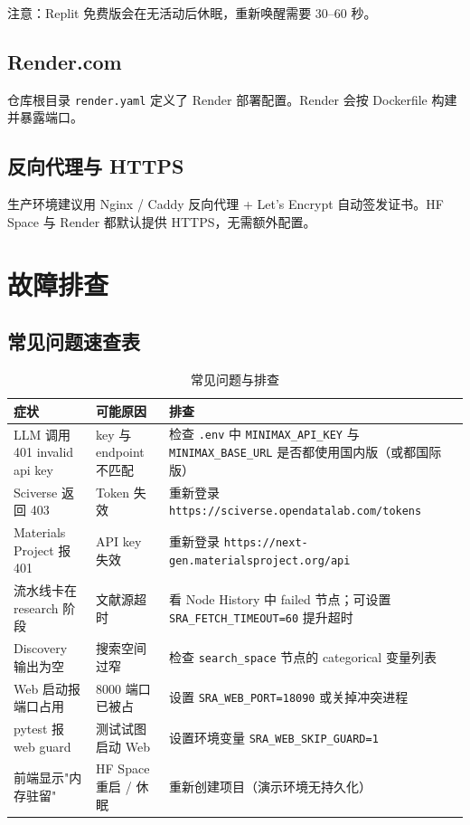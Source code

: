 \documentclass[11pt,a4paper]{article}
\begin{document}
注意：Replit 免费版会在无活动后休眠，重新唤醒需要 30--60 秒。

\subsection{Render.com}

仓库根目录 \texttt{render.yaml} 定义了 Render 部署配置。Render 会按 Dockerfile 构建并暴露端口。

\subsection{反向代理与 HTTPS}

生产环境建议用 Nginx / Caddy 反向代理 + Let's Encrypt 自动签发证书。HF Space 与 Render 都默认提供 HTTPS，无需额外配置。

\section{故障排查}

\subsection{常见问题速查表}

\begin{table}[h]
\centering
\small
\caption{常见问题与排查}
\begin{tabular}{@{}p{4cm}p{6cm}p{3cm}@{}}
\toprule
\textbf{症状} & \textbf{可能原因} & \textbf{排查} \\
\midrule
LLM 调用 401 invalid api key & key 与 endpoint 不匹配 & 检查 \texttt{.env} 中 \texttt{MINIMAX\_API\_KEY} 与 \texttt{MINIMAX\_BASE\_URL} 是否都使用国内版（或都国际版）\\
Sciverse 返回 403 & Token 失效 & 重新登录 \texttt{https://sciverse.opendatalab.com/tokens} \\
Materials Project 报 401 & API key 失效 & 重新登录 \texttt{https://next-gen.materialsproject.org/api} \\
流水线卡在 research 阶段 & 文献源超时 & 看 Node History 中 failed 节点；可设置 \texttt{SRA\_FETCH\_TIMEOUT=60} 提升超时 \\
Discovery 输出为空 & 搜索空间过窄 & 检查 \texttt{search\_space} 节点的 categorical 变量列表 \\
Web 启动报端口占用 & 8000 端口已被占 & 设置 \texttt{SRA\_WEB\_PORT=18090} 或关掉冲突进程 \\
pytest 报 web guard & 测试试图启动 Web & 设置环境变量 \texttt{SRA\_WEB\_SKIP\_GUARD=1} \\
前端显示"内存驻留" & HF Space 重启 / 休眠 & 重新创建项目（演示环境无持久化）\\
\bottomrule
\end{tabular}
\end{table}
\end{document}

